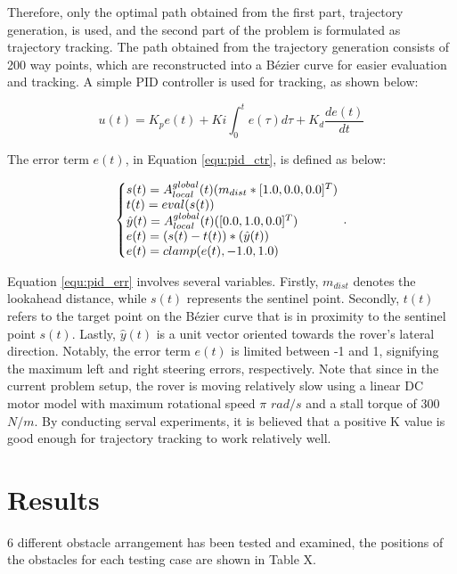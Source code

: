 \documentclass{article}
\begin{document}
Therefore, only the optimal path obtained from the first part, trajectory generation, is used, and the second part of the problem is formulated as trajectory tracking. The path obtained from the trajectory generation consists of 200 way points, which are reconstructed into a Bézier curve for easier evaluation and tracking. A simple PID controller is used for tracking, as shown below:

\begin{equation}
	\label{equ:pid_ctr}
	u(t) = K_{p}e(t) + K{i}\int_{0}^{t}e(\tau)d\tau+K_{d}\frac{de(t)}{dt}
\end{equation}

The error term $e(t)$, in Equation \ref{equ:pid_ctr}, is defined as below: 

\begin{equation}
	\label{equ:pid_err}
	\left\{\begin{array}{@{}l@{}}
	s(t) = A_{local}^{global}(t)(m_{dist}*[1.0, 0.0, 0.0]^{T})  \\
	t(t) = eval(s(t)) \\
	\hat{y}(t) = A_{local}^{global}(t)([0.0, 1.0, 0.0]^{T})  \\
	e(t) = (s(t)-t(t))*(\hat{y}(t)) \\ 
	e(t) = clamp(e(t),-1.0, 1.0)  \\
	\end{array}\right.\,.
\end{equation}


Equation \ref{equ:pid_err} involves several variables. Firstly, $m_{dist}$ denotes the lookahead distance, while $s(t)$ represents the sentinel point. Secondly, $t(t)$ refers to the target point on the Bézier curve that is in proximity to the sentinel point $s(t)$. Lastly, $\hat{y}(t)$ is a unit vector oriented towards the rover's lateral direction. Notably, the error term $e(t)$ is limited between -1 and 1, signifying the maximum left and right steering errors, respectively. Note that since in the current problem setup, the rover is moving relatively slow using a linear DC motor model with maximum rotational speed $\pi$ $rad/s$ and a stall torque of 300 $N/m$. By conducting serval experiments, it is believed that a positive K value is good enough for trajectory tracking to work relatively well.

\section{Results}
6 different obstacle arrangement has been tested and examined, the positions of the obstacles for each testing case are shown in Table X.
\end{document}
